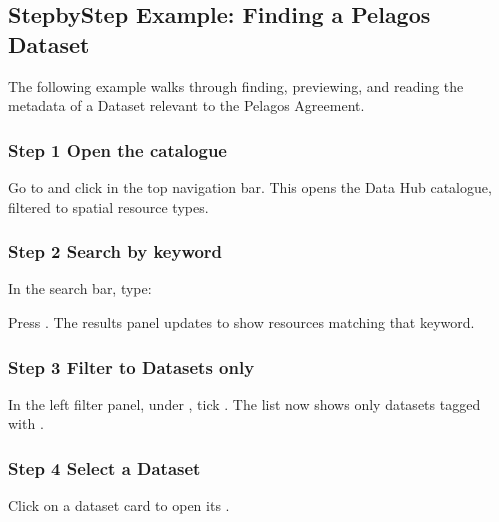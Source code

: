 \documentclass[letterpaper,10pt,english]{sphinxmanual}
\begin{document}
\subsection{Step\sphinxhyphen{}by\sphinxhyphen{}Step Example: Finding a Pelagos Dataset}
\label{\detokenize{en/02_find_and_visualize:step-by-step-example-finding-a-pelagos-dataset}}
\sphinxAtStartPar
The following example walks through finding, previewing, and reading the metadata of a
Dataset relevant to the Pelagos Agreement.


\subsubsection{Step 1 \textendash{} Open the catalogue}
\label{\detokenize{en/02_find_and_visualize:step-1-open-the-catalogue}}
\sphinxAtStartPar
Go to  and click  in the top navigation bar.
This opens the Data Hub catalogue, filtered to spatial resource types.


\subsubsection{Step 2 \textendash{} Search by keyword}
\label{\detokenize{en/02_find_and_visualize:step-2-search-by-keyword}}
\sphinxAtStartPar
In the search bar, type:

\begin{sphinxVerbatim}[commandchars=\\\{\}]
 
\end{sphinxVerbatim}

\sphinxAtStartPar
Press . The results panel updates to show resources matching that keyword.


\subsubsection{Step 3 \textendash{} Filter to Datasets only}
\label{\detokenize{en/02_find_and_visualize:step-3-filter-to-datasets-only}}
\sphinxAtStartPar
In the left filter panel, under , tick .
The list now shows only datasets tagged with .


\subsubsection{Step 4 \textendash{} Select a Dataset}
\label{\detokenize{en/02_find_and_visualize:step-4-select-a-dataset}}
\sphinxAtStartPar
Click on a dataset card to open its .
\end{document}
